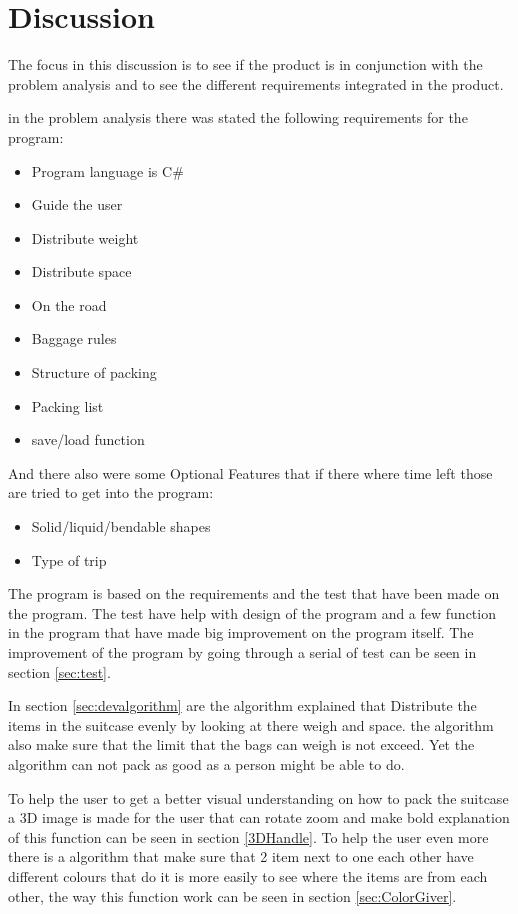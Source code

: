\section{Discussion}
The focus in this discussion is to see if the product is in conjunction with the problem analysis and to see the different requirements integrated in the product.

in the problem analysis there was stated the following requirements for the program:

\begin{itemize}
\item Program language is C\#
\item Guide the user
\item Distribute weight
\item Distribute space
\item On the road
\item Baggage rules
\item Structure of packing
\item Packing list
\item save/load function
\end{itemize}

And there also were some Optional Features that if there where time left those are tried to get into the program:
\begin{itemize}
\item Solid/liquid/bendable shapes
\item Type of trip
\end{itemize}

The program is based on the requirements and the test that have been made on the program. The test have help with design of the program and a few function in the program that have made big improvement on the program itself. The improvement of the program by going through a serial of test can be seen in section \ref{sec:test}.

In section \ref{sec:devalgorithm} are the algorithm explained that Distribute the items in the suitcase evenly by looking at there weigh and space. the algorithm also make sure that the limit that the bags can weigh is not exceed. Yet the algorithm can not pack as good as a person might be able to do.

To help the user to get a better visual understanding on how to pack the suitcase a 3D image is made for the user that can rotate zoom and make bold explanation of this function can be seen in section \ref{3DHandle}. To help the user even more there is a algorithm that make sure that 2 item next to one each other have different colours that do it is more easily to see where the items are from each other, the way this function work can be seen in section \ref{sec:ColorGiver}.

